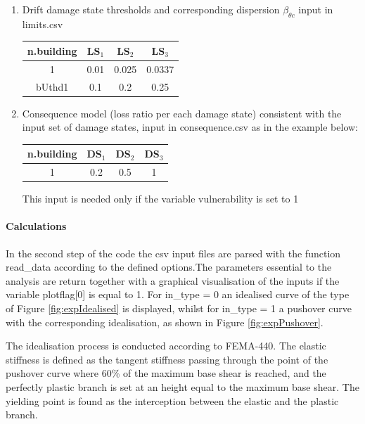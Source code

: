 \begin{enumerate}
\item Drift damage state thresholds and corresponding dispersion  $\beta_{\theta c}$ input in limits.csv
	\begin{table}[H]
	\centering
	\begin{tabular}{|c|c|c|c|} \hline
	\textbf{n.building} & \textbf{LS$_1$} &	\textbf{LS$_2$} &	\textbf{LS$_3$} \\ \hline
	1 & 0.01 &	0.025 & 0.0337\\ \hline
	bUthd1 &	0.1 & 0.2 & 0.25\\ \hline
	\end{tabular}
	\end{table}

\item Consequence model (loss ratio per each damage state) consistent with the input set of damage states, input in consequence.csv as in the example below:
	\begin{table}[H]
	\centering
	\begin{tabular}{|c|c|c|c|} \hline
	\textbf{n.building} & \textbf{DS$_1$} & \textbf{DS$_2$} & \textbf{DS$_3$} \\ \hline
	1 & 0.2	& 0.5	 & 1\\ \hline
	\end{tabular}
	\end{table}
	
This input is needed only if the variable vulnerability is set to 1	
\end{enumerate}

\paragraph{Calculations}
In the second step of the code the csv input files are parsed with the function read\_data according to the defined options.The parameters essential to the analysis are return together with a graphical visualisation of the inputs if the variable plotflag[0] is equal to 1. For in\_type = 0 an idealised curve of the type of Figure \ref{fig:expIdealised} is displayed, whilst for in\_type = 1 a pushover curve with the corresponding idealisation, as shown in Figure \ref{fig:expPushover}. 

The idealisation process is conducted according to FEMA-440. The elastic stiffness is defined as the tangent stiffness passing through the point of the pushover curve where 60\% of the maximum base shear is reached, and the perfectly plastic branch is set at an height equal to the maximum base shear. The yielding point is found as the interception between the elastic and the plastic branch.

